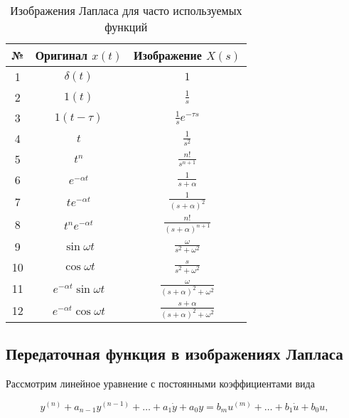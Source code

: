 \documentclass[../../TAU.tex]{subfiles}
\begin{document}
    \begin{table}
        \begin{center}
            \begin{tabular}{|c|c|c|}
            \hline 
            № & Оригинал $x(t)$ & Изображение $X(s)$\\ \hline
            1 & $\delta(t)$ & $1$ \\ \hline
            2 & $1(t)$ & $\frac{1}{s}$ \\ \hline
            3 & $1(t-\tau)$ & $\frac{1}{s} e^{-\tau s}$ \\ \hline
            4 & $t$ & $\frac{1}{s^2}$ \\ \hline
            5 & $t^n$ & $\frac{n!}{s^{n+1}}$ \\ \hline
            6 & $e^{-\alpha t}$ & $\frac{1}{s+\alpha}$ \\ \hline
            7 & $t e^{-\alpha t}$ & $\frac{1}{(s+\alpha)^2}$ \\ \hline
            8 & $t^n e^{-\alpha t}$ & $\frac{n!}{(s+\alpha)^{n+1}}$ \\ \hline
            9 & $\sin{\omega t}$ & $\frac{\omega}{s^2 + \omega^2}$ \\ \hline
            10 & $\cos{\omega t}$ & $\frac{s}{s^2+\omega^2}$ \\ \hline
            11 & $e^{-\alpha t} \sin{\omega t}$ & $\frac{\omega}{(s+\alpha)^2+\omega^2}$ \\ \hline
            12 & $e^{-\alpha t} \cos{\omega t}$ & $\frac{s+\alpha}{(s+\alpha)^2+\omega^2}$ \\ \hline
            \end{tabular}
            \caption{Изображения Лапласа для часто используемых функций}
        \end{center}
    \end{table}




\subsection{Передаточная функция в изображениях Лапласа} %

    Рассмотрим линейное уравнение с постоянными коэффициентами вида

    \begin{equation}\label{EQ_ODU}
    y^{(n)} + a_{n-1}y^{(n-1)} + \ldots + a_1 \dot y + a_0y = b_m u^{(m)} + \ldots + b_1 \dot u + b_0 u,
    \end{equation}
\end{document}
